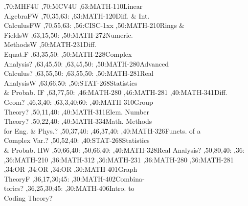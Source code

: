 \documentclass{article}
\begin{document}
\thispagestyle{empty}
\begin{chart}
,70:{MHF4U}
,70:{MCV4U}
,63:{MATH-110}{Linear\\Algebra}{FW}
  ,70,35,63:
,63:{MATH-120}{Diff. \& Int.\\Calculus}{FW}
  ,70,55,63:
,56:{CISC-1xx}
,50:{MATH-210}{Rings \&\\Fields}{W}
  ,63,15,50:
,50:{MATH-272}{Numeric.\\Methods}{W}
,50:{MATH-231}{Diff.\\Equat.}{F}
  ,63,35,50:
,50:{MATH-228}{Complex\\Analysis}{?}
  ,63,45,50:
  ,63,45,50:
,50:{MATH-280}{Advanced\\Calculus}{?}
  ,63,55,50:
  ,63,55,50:
,50:{MATH-281}{Real\\Analysis}{W}
  ,63,66,50:
,50:{STAT-268}{Statistics\\\& Probab. I}{F}
  ,63,77,50:
,46:{MATH-280}
,46:{MATH-281}
,40:{MATH-341}{Diff.\\Geom}{?}
  ,46,3,40:
  ,63,3,40;60:
,40:{MATH-310}{Group\\Theory}{?}
  ,50,11,40:
,40:{MATH-311}{Elem. Number\\Theory}{?}
  ,50,22,40:
,40:{MATH-334}{Math. Methods\\for Eng. \& Phys.}{?}
  ,50,37,40:
  ,46,37,40:
,40:{MATH-326}{Functs. of a\\Complex Var.}{?}
  ,50,52,40:
,40:{STAT-268}{Statistics\\\& Probab. II}{W}
  ,50,66,40:
  ,50,66,40:
,40:{MATH-328}{Real Analysis}{?}
  ,50,80,40:
,36:{}
,36:{MATH-210}
,36:{MATH-312}
,36:{MATH-231}
,36:{MATH-280}
,36:{MATH-281}
,34:{OR}
,34:{OR}
,34:{OR}
,30:{MATH-401}{Graph\\Theory}{F}
  ,36,17,30;45:
,30:{MATH-402}{Combina-\\torics}{?}
  ,36,25,30;45:
,30:{MATH-406}{Intro. to\\Coding Theory}{?}

\end{chart}
\end{document}
